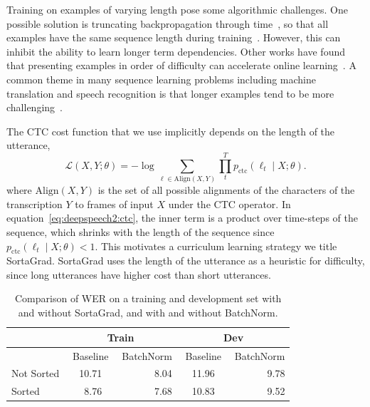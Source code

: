 Training on examples of varying length pose some algorithmic challenges. One
possible solution is truncating backpropagation through
time~\cite{williams1990}, so that all examples have the same sequence length
during training~\cite{sainath2015}. However, this can inhibit the ability to
learn longer term dependencies. Other works have found that presenting examples
in order of difficulty can accelerate online
learning~\cite{bengio2009curriculum, zaremba2014}. A common theme in many
sequence learning problems including machine translation and speech recognition
is that longer examples tend to be more challenging~\cite{cho2014}.

The CTC cost function that we use implicitly depends on the length of the
utterance,
\begin{equation}
\label{eq:deepspeech2:ctc}
    \mathcal{L}(X, Y; \theta) = -\log \sum_{\ell \in \textrm{Align}(X, Y)}
        \prod_t^{T} p_{\textrm{ctc}}(\ell_t \mid X; \theta).
\end{equation}
where $\textrm{Align}(X, Y)$ is the set of all possible alignments of the
characters of the transcription $Y$ to frames of input $X$ under the CTC
operator. In equation~\ref{eq:deepspeech2:ctc}, the inner term is a product
over time-steps of the sequence, which shrinks with the length of the sequence
since $p_{\textrm{ctc}}(\ell_t \mid X;\theta)<1$. This motivates a curriculum
learning strategy we title SortaGrad. SortaGrad uses the length of the
utterance as a heuristic for difficulty, since long utterances have higher cost
than short utterances.

\begin{table}
\centering
\begin{tabular}{l  r r r  r  r r r  r}
\toprule
& \multicolumn{4}{c}{Train} & \multicolumn{4}{c}{Dev}\\
\midrule
& \multicolumn{3}{c}{Baseline} &  BatchNorm & \multicolumn{3}{c}{Baseline} & BatchNorm\\
\midrule
Not Sorted & & 10.71 & & 8.04 & & 11.96 & & 9.78 \\
Sorted     & & 8.76 & & 7.68 & & 10.83 & & 9.52 \\
\bottomrule
\end{tabular}
\caption{Comparison of WER on a training and development set with and without
         SortaGrad, and with and without BatchNorm.}
\label{table:deepspeech2:sorting}
\end{table}

